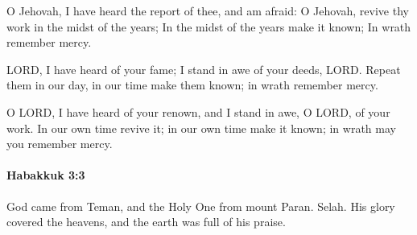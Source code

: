 			\begin{versebox}
					\item[BHS] 
					\item[LXX] 
					\item[ASV] O Jehovah, I have heard the report of thee, and am afraid: O Jehovah, revive thy work in the midst of the years; In the midst of the years make it known; In wrath remember mercy.
					\item[NIV] LORD, I have heard of your fame; I stand in awe of your deeds, LORD. Repeat them in our day, in our time make them known; in wrath remember mercy.
					\item[NRSV] O LORD, I have heard of your renown, and I stand in awe, O LORD, of your work. In our own time revive it; in our own time make it known; in wrath may you remember mercy.
			\end{versebox}

		\paragraph{Habakkuk 3:3} %
			\label{HABAKKUK-3-3}

			God came from Teman, and the Holy One from mount Paran. Selah. His glory covered the heavens, and the earth was full of his praise.

